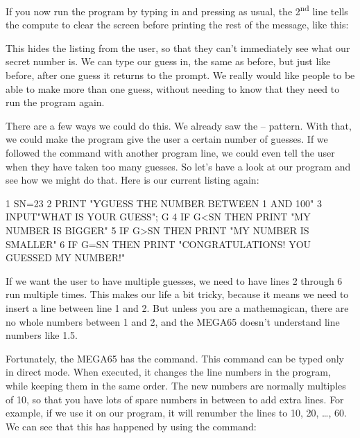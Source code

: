 
\needspace{2cm}
If you now run the program by typing in  and pressing
 as usual, the 2\textsuperscript{nd} line tells
the compute to clear the screen before printing the rest of the message, like this:


This hides the listing from the user, so that they can't immediately see
what our secret number is. We can type our guess in, the same as before,
but just like before, after one guess it returns to the 
prompt.  We really would like people to be able to make more than one
guess, without needing to know that they need to run the program
again.

\needspace{3cm}
There are a few ways we could do this. We already saw the  --
 pattern. With that, we could make the program give the
user a certain number of guesses.  If we followed the 
command with another program line, we could even tell the user when
they have taken too many guesses.  So let's have a look at our
program and see how we might do that.  Here is our current listing again:

\begin{screencode}
1 SN=23
2 PRINT "ƳGUESS THE NUMBER BETWEEN 1 AND 100"
3 INPUT"WHAT IS YOUR GUESS"; G
4 IF G<SN THEN PRINT "MY NUMBER IS BIGGER"
5 IF G>SN THEN PRINT "MY NUMBER IS SMALLER"
6 IF G=SN THEN PRINT "CONGRATULATIONS! YOU GUESSED MY NUMBER!"
\end{screencode}

If we want the user to have multiple guesses, we need to have lines 2
through 6 run multiple times.  This makes our life a bit tricky,
because it means we need to insert a line between line 1 and 2. But
unless you are a mathemagican, there are no whole numbers between 1
and 2, and the MEGA65 doesn't understand line numbers like 1.5.

\needspace{4cm}
Fortunately, the MEGA65 has the
command.  This command can be typed only in direct mode. When
executed, it changes the line numbers in the program, while keeping
them in the same order.  The new numbers are normally multiples of 10,
so that you have lots of spare numbers in between to add extra lines.
For example, if we use it on our program, it will renumber the lines
to 10, 20, \ldots, 60. We can see that this has happened by using the
 command:

